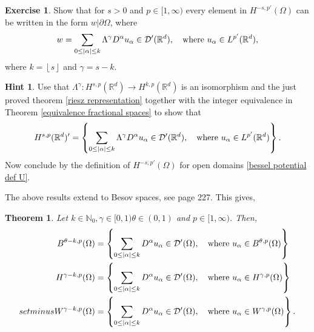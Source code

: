 \documentclass[
    a4paper,
    DIV=14,
    abstract=true,
    numbers=noenddot
]
{scrartcl}
\newtheorem{theorem}{Theorem}[section]
\theoremstyle{definition}
\newtheorem{exercise}{Exercise}
\newtheorem*{hint}{Hint}
\newcommand{\set}[1]{\left\{#1\right\}}
\newcommand\restr[2]{\left.#1\right|{#2}}
\newcommand{\N}{\mathbb{N}}
\newcommand{\R}{\mathbb{R}}
\newcommand{\Dd}{\mathcal{D}}
\begin{document}
\begin{exercise}
    Show that for $s>0$ and $p \in [1,\infty)$ every element in $H^{-s,p'}(\Omega )$ can be written in the form $\restr{w}{\partial \Omega }$, where
    \begin{align*}
        w=\sum_{0\leq\abs{\alpha}\leq k} \Lambda^{\gamma } D^\alpha u_\alpha\in \Dd'(\R^d ),\quad \text{where }    u_\alpha \in L^{p'}(\R^d ),
    \end{align*}
    where $k =\left\lfloor s \right\rfloor$ and $\gamma =s-k$.
\end{exercise}
\begin{hint}
    Use that $\Lambda ^{\gamma }: H^{s,p}(\R^d) \to H^{k ,p}(\R^d)$ is an isomorphism and the just proved theorem \ref{riesz representation} together with the integer equivalence in Theorem \ref{equivalence fractional spaces} to show that
    \begin{align*}
        H^{s,p}(\R^d)' = \set{ \sum_{0\leq\abs{\alpha}\leq k} \Lambda^{\gamma } D^\alpha u_\alpha\in \Dd'(\R^d ),\quad \text{where }    u_\alpha \in L^{p'}(\R^d )}.
    \end{align*}
    Now conclude by the definition of $H^{-s,p'}(\Omega )$ for open domains \ref{bessel potential def U}.
\end{hint}
The above results extend to Besov spaces, see \cite{agranovich2015sobolev} page 227. This gives,
\begin{theorem}
    Let  $k \in \N_0, \gamma \in [0,1) \theta \in (0,1)$ and $p \in [1,\infty)$. Then,
    \begin{align*}
        B^{\theta  -k,p}(\Omega ) & = \set{ \sum_{0\leq\abs{\alpha}\leq k} D^\alpha u_\alpha\in \Dd'(\Omega ),\quad \text{where }    u_\alpha \in B^{\theta  ,p}(\Omega )} \\
        H^{\gamma -k,p}(\Omega )  & = \set{ \sum_{0\leq\abs{\alpha}\leq k} D^\alpha u_\alpha\in \Dd'(\Omega ),\quad \text{where }    u_\alpha \in H^{\gamma ,p}(\Omega )}  \\setminus	W^{\gamma -k,p}(\Omega )  & = \set{ \sum_{0\leq\abs{\alpha}\leq k} D^\alpha u_\alpha\in \Dd'(\Omega ),\quad \text{where }    u_\alpha \in W^{\gamma ,p}(\Omega )}.
    \end{align*}
\end{theorem}
\end{document}

